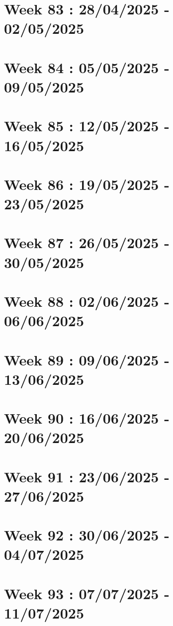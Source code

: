 \documentclass[french]{article}
\begin{document}
	\section{Week 83 : 28/04/2025 - 02/05/2025}

	\section{Week 84 : 05/05/2025 - 09/05/2025}

	\section{Week 85 : 12/05/2025 - 16/05/2025}

	\section{Week 86 : 19/05/2025 - 23/05/2025}

	\section{Week 87 : 26/05/2025 - 30/05/2025}

	\section{Week 88 : 02/06/2025 - 06/06/2025}

	\section{Week 89 : 09/06/2025 - 13/06/2025}

	\section{Week 90 : 16/06/2025 - 20/06/2025}

	\section{Week 91 : 23/06/2025 - 27/06/2025}

	\section{Week 92 : 30/06/2025 - 04/07/2025}

	\section{Week 93 : 07/07/2025 - 11/07/2025}
\end{document}
